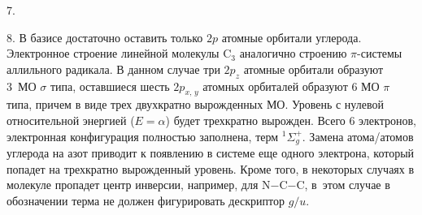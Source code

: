 7. \par
8. В базисе достаточно оставить только $2p$ атомные орбитали углерода. Электронное строение линейной молекулы $\text{C}_3$ аналогично строению $\pi$-системы аллильного радикала. В данном случае три $2p_z$ атомные орбитали образуют 3~МО $\sigma$ типа, оставшиеся шесть $2p_{x,\,y}$ атомных орбиталей образуют 6 МО $\pi$ типа, причем в виде трех двухкратно вырожденных МО. Уровень с нулевой относительной энергией ($E=\alpha$) будет трехкратно вырожден. Всего 6 электронов, электронная конфигурация полностью заполнена, терм $^1\Sigma^+_g$. Замена атома/атомов углерода на азот приводит к появлению в системе еще одного электрона, который попадет на трехкратно вырожденный уровень. Кроме того, в некоторых случаях в молекуле пропадет центр инверсии, например, для N$-$C$-$C, в~этом случае в обозначении терма не должен фигурировать дескриптор $g/u$.\par
\newpage

